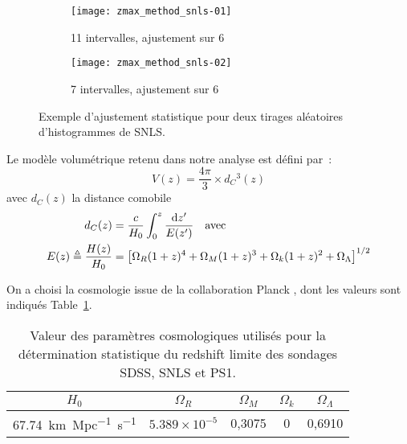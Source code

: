 \documentclass[../main/main.tex]{subfiles}
\begin{document}
\begin{figure}[ht]
    \centering
    \begin{subfigure}[]{.49\linewidth}
        \centering
        \texttt{[image: zmax\_method\_snls-01]}
        \captionsetup{justification=centering}
        \caption{11 intervalles, ajustement sur 6}
        \label{fig:zmax_method1}
    \end{subfigure}
    \begin{subfigure}[]{.49\linewidth}
        \centering
        \texttt{[image: zmax\_method\_snls-02]}
        \captionsetup{justification=centering}
        \caption{7 intervalles, ajustement sur 6}
        \label{fig:zmax_method2}
    \end{subfigure}
    \captionsetup{justification=centering}
    \caption{Exemple d'ajustement statistique pour deux tirages aléatoires
    d'histogrammes de SNLS.}
    \label{fig:zmax_method}
\end{figure}


Le modèle volumétrique retenu dans notre analyse est défini par~:
\begin{equation}\label{eq:comobvol}
    V(z) = \frac{4\pi}{3}\times d_C{}^3(z)
\end{equation}
avec $d_C(z)$ la distance comobile
\begin{align}
    d_C(z)                           & =
    \frac{c}{H_0} \int_{0}^{z} \frac{\mathrm{d} z'}{E(z')}
    \quad\text{avec}\quad\\
    E(z) \triangleq \frac{H(z)}{H_0} & =
    \left[\Omega_R(1+z)^4 + \Omega_M(1+z)^3 +
        \Omega_k(1+z)^2 + \Omega_\Lambda
    \right]^{1/2}
\end{align}

On a choisi la cosmologie issue de la collaboration Planck \citep{planck2018},
dont les valeurs sont indiqués Table~\ref{tab:planckvals}.

\begin{table}[ht]
    \centering
    \caption{Valeur des paramètres cosmologiques utilisés pour la détermination
    statistique du redshift limite des sondages SDSS, SNLS et PS1.}
    \label{tab:planckvals}
    \begin{tabular}{ccccc}
        \toprule
        $H_0$ &
        $\Omega_R$ & $\Omega_M$ & $\Omega_k$ & $\Omega_\Lambda$ \\
        \midrule
        \SI{67,74}{km.Mpc^{-1}.s^{-1}} &
        $5.389\times10^{-5}$ & 0,3075 & 0 & 0,6910 \\ 
        \bottomrule
    \end{tabular}
\end{table}
\end{document}
